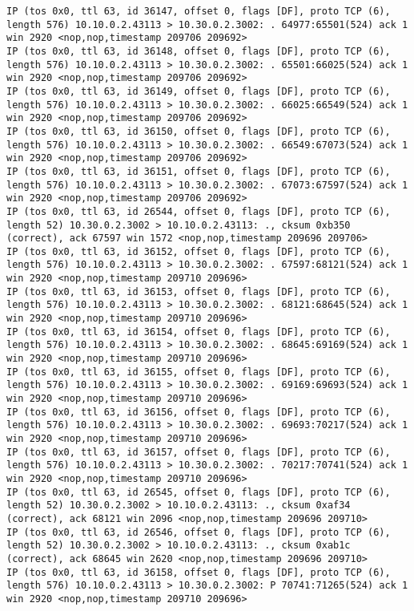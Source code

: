 \documentclass[a4paper,12pt]{article}
\begin{document}
\begin{lstlisting}
IP (tos 0x0, ttl 63, id 36147, offset 0, flags [DF], proto TCP (6), length 576) 10.10.0.2.43113 > 10.30.0.2.3002: . 64977:65501(524) ack 1 win 2920 <nop,nop,timestamp 209706 209692>
IP (tos 0x0, ttl 63, id 36148, offset 0, flags [DF], proto TCP (6), length 576) 10.10.0.2.43113 > 10.30.0.2.3002: . 65501:66025(524) ack 1 win 2920 <nop,nop,timestamp 209706 209692>
IP (tos 0x0, ttl 63, id 36149, offset 0, flags [DF], proto TCP (6), length 576) 10.10.0.2.43113 > 10.30.0.2.3002: . 66025:66549(524) ack 1 win 2920 <nop,nop,timestamp 209706 209692>
IP (tos 0x0, ttl 63, id 36150, offset 0, flags [DF], proto TCP (6), length 576) 10.10.0.2.43113 > 10.30.0.2.3002: . 66549:67073(524) ack 1 win 2920 <nop,nop,timestamp 209706 209692>
IP (tos 0x0, ttl 63, id 36151, offset 0, flags [DF], proto TCP (6), length 576) 10.10.0.2.43113 > 10.30.0.2.3002: . 67073:67597(524) ack 1 win 2920 <nop,nop,timestamp 209706 209692>
IP (tos 0x0, ttl 63, id 26544, offset 0, flags [DF], proto TCP (6), length 52) 10.30.0.2.3002 > 10.10.0.2.43113: ., cksum 0xb350 (correct), ack 67597 win 1572 <nop,nop,timestamp 209696 209706>
IP (tos 0x0, ttl 63, id 36152, offset 0, flags [DF], proto TCP (6), length 576) 10.10.0.2.43113 > 10.30.0.2.3002: . 67597:68121(524) ack 1 win 2920 <nop,nop,timestamp 209710 209696>
IP (tos 0x0, ttl 63, id 36153, offset 0, flags [DF], proto TCP (6), length 576) 10.10.0.2.43113 > 10.30.0.2.3002: . 68121:68645(524) ack 1 win 2920 <nop,nop,timestamp 209710 209696>
IP (tos 0x0, ttl 63, id 36154, offset 0, flags [DF], proto TCP (6), length 576) 10.10.0.2.43113 > 10.30.0.2.3002: . 68645:69169(524) ack 1 win 2920 <nop,nop,timestamp 209710 209696>
IP (tos 0x0, ttl 63, id 36155, offset 0, flags [DF], proto TCP (6), length 576) 10.10.0.2.43113 > 10.30.0.2.3002: . 69169:69693(524) ack 1 win 2920 <nop,nop,timestamp 209710 209696>
IP (tos 0x0, ttl 63, id 36156, offset 0, flags [DF], proto TCP (6), length 576) 10.10.0.2.43113 > 10.30.0.2.3002: . 69693:70217(524) ack 1 win 2920 <nop,nop,timestamp 209710 209696>
IP (tos 0x0, ttl 63, id 36157, offset 0, flags [DF], proto TCP (6), length 576) 10.10.0.2.43113 > 10.30.0.2.3002: . 70217:70741(524) ack 1 win 2920 <nop,nop,timestamp 209710 209696>
IP (tos 0x0, ttl 63, id 26545, offset 0, flags [DF], proto TCP (6), length 52) 10.30.0.2.3002 > 10.10.0.2.43113: ., cksum 0xaf34 (correct), ack 68121 win 2096 <nop,nop,timestamp 209696 209710>
IP (tos 0x0, ttl 63, id 26546, offset 0, flags [DF], proto TCP (6), length 52) 10.30.0.2.3002 > 10.10.0.2.43113: ., cksum 0xab1c (correct), ack 68645 win 2620 <nop,nop,timestamp 209696 209710>
IP (tos 0x0, ttl 63, id 36158, offset 0, flags [DF], proto TCP (6), length 576) 10.10.0.2.43113 > 10.30.0.2.3002: P 70741:71265(524) ack 1 win 2920 <nop,nop,timestamp 209710 209696>

\end{lstlisting}
\end{document}
